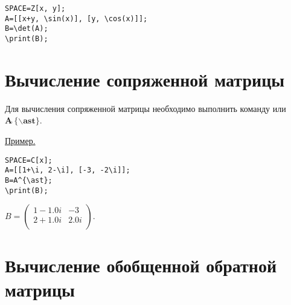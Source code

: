 
\begin{verbatim}
SPACE=Z[x, y]; 
A=[[x+y, \sin(x)], [y, \cos(x)]];
B=\det(A); 
\print(B);
\end{verbatim}


\section{Вычисление сопряженной матрицы}
Для вычисления сопряженной матрицы необходимо выполнить команду  
   или $\mathbf {A\widehat{\ } \{ \backslash ast\}}$. 

\underline{Пример. }

\vspace*{-2mm}
\begin{verbatim}
SPACE=C[x];
A=[[1+\i, 2-\i], [-3, -2\i]];
B=A^{\ast};
\print(B);
\end{verbatim}

{$
B = \left(\begin{array}{cc}
1-1. 0i& -3  \\
 2+1. 0i& 2. 0i\\ \end{array}\right). $}

\section{Вычисление обобщенной обратной матрицы}

